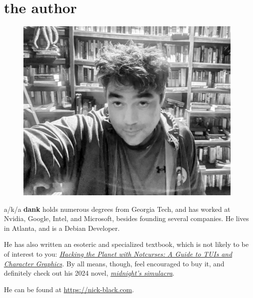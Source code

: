 \clearpage
\openany
\pagestyle{empty}
\chapter{the author}
\begin{figure}[!tbp]
  \centering
  \includegraphics[width=\textwidth]{images/arrayfire.jpg}
\end{figure}
\bigskip
\begin{center}
\end{center}
\noindent\textbf{\theauthor} a/k/a \textbf{dank} holds numerous degrees from Georgia Tech, and has worked
at Nvidia, Google, Intel, and Microsoft, besides founding several companies.
He lives in Atlanta, and is a Debian Developer.

He has also written an esoteric and specialized textbook, which is not
 likely to be of interest to you: \textit{\href{https://www.amazon.com/Hacking-Planet-Notcurses-Character-Graphics/dp/B086PNVNC9}{Hacking the Planet with Notcurses: A Guide to TUIs and Character Graphics}.}
By all means, though, feel encouraged to buy it,
 and definitely check out his 2024 novel, \textit{\href{https://www.amazon.com/midnights-simulacra-Nick-Black/dp/B0CSVJZB4R}{midnight's simulacra}}.

\bigskip\noindent{}He can be found at \url{https://nick-black.com}.
